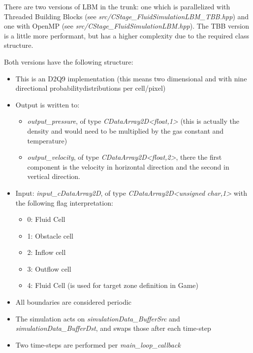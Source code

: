
There are two versions of LBM in the trunk: one which is parallelized with Threaded Building Blocks (see \textit{src/CStage\_FluidSimulationLBM\_TBB.hpp}) and one with OpenMP (see \textit{src/CStage\_FluidSimulationLBM.hpp}). The TBB version is a little more performant, but has a higher complexity due to the required class structure.

Both versions have the following structure:
\begin{itemize}
    \item This is an D2Q9 implementation (this means two dimensional and with nine directional probabilitydistributions per cell/pixel)
    \item Output is written to:
    \begin{itemize}
        \item \textit{output\_pressure}, of type \textit{CDataArray2D<float,1>} (this is actually the density and would need to be multiplied by the gas constant and temperature) 
        \item \textit{output\_velocity}, of type \textit{CDataArray2D<float,2>}, there the first component is the velocity in horizontal direction and the second in vertical direction.
    \end{itemize} 
    \item Input: \textit{input\_cDataArray2D}, of type \textit{CDataArray2D<unsigned char,1>} with the following flag interpretation:
    \begin{itemize}
        \item 0: Fluid Cell
        \item 1: Obstacle cell
        \item 2: Inflow cell
        \item 3: Outflow cell
        \item 4: Fluid Cell (is used for target zone definition in Game)
    \end{itemize}
    \item All boundaries are considered periodic
    \item The simulation acts on \textit{simulationData\_BufferSrc} and \textit{simulationData\_BufferDst}, and swaps those after each time-step
    \item Two time-steps are performed per \textit{main\_loop\_callback}
\end{itemize}
